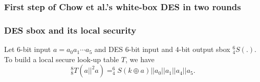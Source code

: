\documentclass{beamer}
\begin{document}
\frame
{
\frametitle{First step of Chow et al.'s white-box DES in two rounds}
\begin{center}
\end{center}
}

\frame
{
\frametitle{DES sbox and its local security}
Let $6$-bit input $a=a_{0}a_{1}\cdots a_{5}$ and DES $6$-bit input and $4$-bit output sbox $^{6}_{4}S(.)$. To build a local secure look-up table $T$, we have
\[^{8}_{8}T(a||^{2}a)=^{6}_{4}S(k\oplus a)||a_{0}||a_{1}||a_{4}||a_{5}.\]

\begin{figure}[h]
\centering
{}
\end{figure}
}
\end{document}

